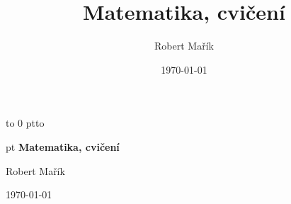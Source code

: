 \documentclass{article}
\begin{document}
\title{Matematika, cvičení}
\author{Robert Mařík}
\date{\today}



\begin{titlepage}

  {\centering 

    \vbox to 0 pt{\kern -1.1cm\hbox to \vss}

  }

  \begin{minipage}{\linewidth} \sffamily
{} pt
    \bfseries\centering
    \vspace*{0.5cm}
{\Huge Matematika, cvičení}

\bigskip
  {\Large Robert Mařík}

  \bigskip
  {\today}
  
\end{minipage}
  
  
\end{titlepage}

\tableofcontents

\clearpage

\end{document}
